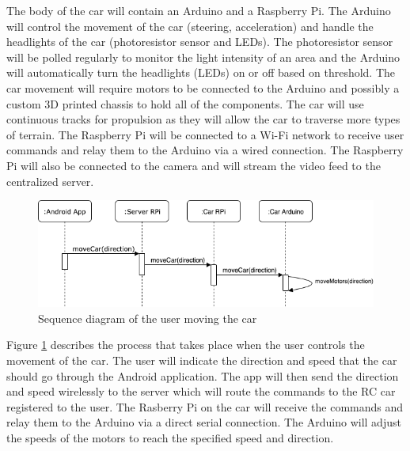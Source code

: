 \documentclass[letterpaper,12pt]{report}
\begin{document}
	The body of the car will contain an Arduino and a Raspberry Pi. The Arduino
	will control the movement of the car (steering, acceleration) and handle the
	headlights of the car (photoresistor sensor and LEDs). The photoresistor
	sensor will be polled regularly to monitor the light intensity of an area
	and the Arduino will automatically turn the headlights (LEDs) on or off
	based on threshold. The car movement will require motors to be connected to
	the Arduino and possibly a custom 3D printed chassis to hold all of the
	components. The car will use continuous tracks for propulsion as they will
	allow the car to traverse more types of terrain. The Raspberry Pi will be
	connected to a Wi-Fi network to receive user commands and relay them to the
	Arduino via a wired connection. The Raspberry Pi will also be connected to
	the camera and will stream the video feed to the centralized server.\\

	\begin{figure}[H]
    	\centering
		\includegraphics[width=\linewidth]{diagrams/Proposal_Car_Movement_Sequence.png}
    	\caption{Sequence diagram of the user moving the car}
    	\label{fig:movement}
	\end{figure}

	Figure \ref{fig:movement} describes the process that takes place when
	the user controls the movement of the car. The user will indicate the
	direction and speed that the car should go through the Android application.
	The app will then send the direction and speed wirelessly to the server
	which will route the commands to the RC car registered to the user. The
	Rasberry Pi on the car will receive the commands and relay them to the
	Arduino via a direct serial connection. The Arduino will adjust the speeds
	of the motors to reach the specified speed and direction.
\end{document}
